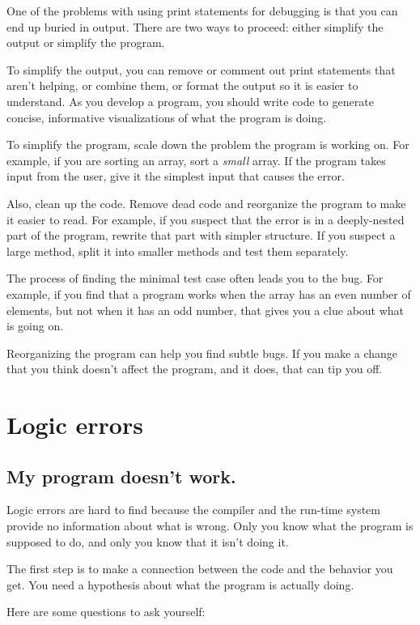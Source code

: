 \documentclass[12pt]{book}
\theoremstyle{definition}
\begin{document}
One of the problems with using print statements for debugging
is that you can end up buried in output.  There are two ways
to proceed: either simplify the output or simplify the program.

To simplify the output, you can remove or comment out print
statements that aren't helping, or combine them, or format
the output so it is easier to understand.  As you develop a program,
you should write code to generate concise,
informative visualizations of what the program is doing.

To simplify the program,
scale down the problem the program is working on.  For example, if you
are sorting an array, sort a {\em small} array.  If the program takes
input from the user, give it the simplest input that causes the
error.

Also, clean up the code.  Remove dead code and reorganize the
program to make it easier to read.  For example, if you
suspect that the error is in a deeply-nested part of the program,
rewrite that part with simpler structure.  If you suspect a
large method, split it into smaller methods and test them
separately.

The process of finding the minimal test case often leads you to the
bug.  For example, if you find that a program works when the array has
an even number of elements, but not when it has an odd number, that
gives you a clue about what is going on.

Reorganizing the program can help you find subtle
bugs.  If you make a change that you think doesn't affect the
program, and it does, that can tip you off.


\section{Logic errors}

\subsection*{My program doesn't work.}

Logic errors are hard to find because the
compiler and the run-time system provide no information about
what is wrong.  Only you know what the program is supposed to
do, and only you know that it isn't doing it.

The first step is to make a connection between the code and the
behavior you get.  You need a hypothesis about what the program
is actually doing.

Here are some questions to ask yourself:
\end{document}
